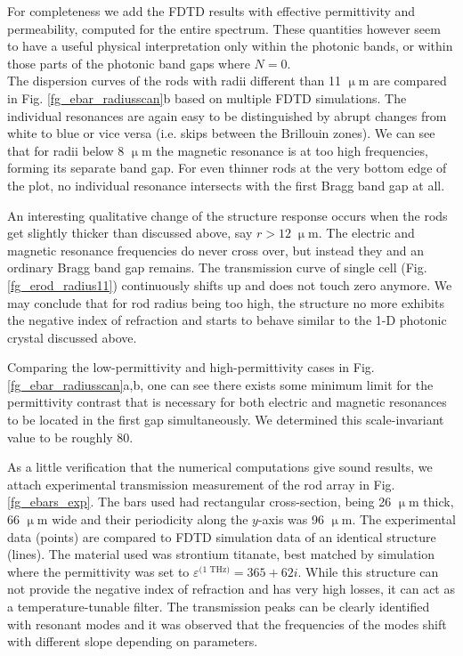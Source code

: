 \documentclass[letterpaper,12pt]{report}
\newcommand{\um}{\mbox{$\upmu$m}}
\begin{document}
For completeness we add the FDTD results with effective permittivity and permeability, computed for the entire spectrum. These quantities however seem to have a useful physical interpretation only within the photonic bands, or within those parts of the photonic band gaps where $N = 0$. 
\\

The dispersion curves of the rods with radii different than 11 $\upmu$m are compared in Fig. \ref{fg_ebar_radiusscan}b based on multiple FDTD simulations. The individual resonances are again easy to be distinguished by abrupt changes from white to blue or vice versa (i.e. skips between the Brillouin zones). We can see that for radii below 8 $\upmu$m the magnetic resonance is at too high frequencies, forming its separate band gap. For even thinner rods at the very bottom edge of the plot, no individual resonance intersects with the first Bragg  band gap at all. 

An interesting qualitative change of the structure response occurs when the rods get slightly thicker than discussed above, say $r > 12\;\upmu$m. The electric and magnetic resonance frequencies do never cross over, but instead they  and an ordinary Bragg band gap remains. The transmission curve of single cell (Fig. \ref{fg_erod_radius11}) continuously shifts up and does not touch zero anymore. We may conclude that for rod radius being too high, the structure no more exhibits the negative index of refraction and starts to behave similar to the 1-D photonic crystal discussed above.


Comparing the low-permittivity and high-permittivity cases in Fig. \ref{fg_ebar_radiusscan}a,b, one can see there exists some minimum limit for the permittivity contrast that is necessary for both electric and magnetic resonances to be located in the first gap simultaneously. We determined this scale-invariant value to be roughly 80.

As a little verification that the numerical computations give sound results, we attach experimental transmission measurement of the rod array in Fig. \ref{fg_ebars_exp}.
The bars used had rectangular cross-section, being 26 $\upmu$m thick, 66 $\upmu$m  wide and their periodicity along the $y$-axis was 96 $\upmu$m.  The experimental data (points) are compared to FDTD simulation data of an identical structure (lines). The material used was strontium titanate, best matched by simulation where the permittivity was set to $\varepsilon^{\text{(1 THz)}} = 365 + 62i$.  While this structure can not provide the negative index of refraction and has very high losses, it can act as a temperature-tunable filter. The transmission peaks can be clearly identified with resonant modes and it was observed that the frequencies of the modes shift with different slope depending on parameters.  
 
\end{document}
